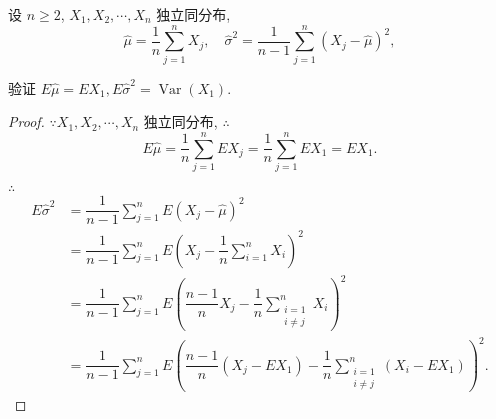 \documentclass{ctexart}
\begin{document}
\addtocounter{exercise}{2}
\begin{exercise}%
    设 $n\geq 2$, $X_1,X_2,\cdots,X_n$ 独立同分布,
    \[\hat{\mu}=\dfrac{1}{n}\sum\limits_{j=1}^nX_j,\quad\hat{\sigma}^2=\dfrac{1}{n-1}\sum\limits_{j=1}^n(X_j-\hat{\mu})^2,\]

    验证 $E\hat{\mu}=EX_1,E\hat{\sigma}^2=\operatorname{Var}(X_1)$.
\end{exercise}
\begin{proof}
    $\because X_1,X_2,\cdots,X_n$ 独立同分布, $\therefore$
    \[E\hat{\mu}=\dfrac{1}{n}\sum\limits_{j=1}^nEX_j=\dfrac{1}{n}\sum\limits_{j=1}^nEX_1=EX_1.\]

    $\therefore$
    \begin{align*}
        E\hat{\sigma}^2 & =\dfrac{1}{n-1}\sum\limits_{j=1}^nE(X_j-\hat{\mu})^2 \\
        & =\dfrac{1}{n-1}\sum\limits_{j=1}^nE\left(X_j-\dfrac{1}{n}\sum\limits_{i=1}^nX_i\right)^2 \\
        & =\dfrac{1}{n-1}\sum\limits_{j=1}^nE\left(\dfrac{n-1}{n}X_j-\dfrac{1}{n}\sum\limits_{\substack{i=1\\i\neq j}}^nX_i\right)^2 \\
        & =\dfrac{1}{n-1}\sum\limits_{j=1}^nE\left(\dfrac{n-1}{n}(X_j-EX_1)-\dfrac{1}{n}\sum\limits_{\substack{i=1\\i\neq j}}^n(X_i-EX_1)\right)^2.
    \end{align*}


\end{proof}
\end{document}
